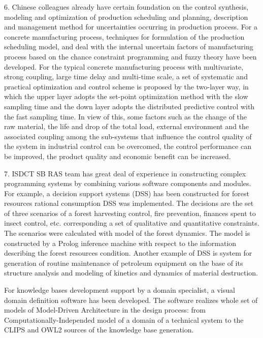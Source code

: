 \documentclass[runningheads]{llncs}
\begin{document}
6. Chinese colleagues already have certain foundation on the control synthesis, modeling and optimization of production scheduling and planning, description and management method for uncertainties occurring in production process. For a concrete manufacturing process, techniques for formulation of the production scheduling model, and deal with the internal uncertain factors of manufacturing process based on the chance constraint programming and fuzzy theory \cite{b6} have been developed. For the typical concrete manufacturing process with multivariate, strong coupling, large time delay and multi-time scale, a set of systematic and practical optimization and control scheme is proposed by the two-layer way, in which the upper layer adopts the set-point optimization method with the slow sampling time and the down layer adopts the distributed predictive control with the fast sampling time. In view of this, some factors such as the change of the raw material, the life and drop of the total load, external environment and the associated coupling among the sub-systems that influence the control quality of the system in industrial control can be overcomed, the control performance can be improved, the product quality and economic benefit can be increased.

7. ISDCT SB RAS team has great deal of experience in constructing complex programming systems by combining various software components and modules. For example, a decision support systems (DSS) has been constructed for forest resources rational consumption DSS was implemented. The decisions are the set of three scenarios of a forest harvesting control, fire prevention, finances spent to insect control, etc. corresponding a set of qualitative and quantitative constraints. The scenarios were calculated with model of the forest dynamics. The model is constructed by a Prolog inference machine with respect to the information describing the forest resources condition. Another example of DSS is system for generation of routine maintenance of petroleum equipment on the base of its structure analysis and modeling of kinetics and dynamics of material destruction.

For knowledge bases development support by a domain specialist, a visual domain definition software has been developed. The software realizes whole set of models of Model-Driven Architecture in the design process: from Computationally-Independed model of a domain of a technical system to the CLIPS and OWL2 sources of the knowledge base generation.
\end{document}
